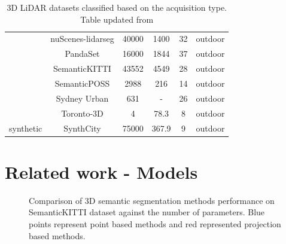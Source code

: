 \begin{table}[h!]
\begin{tabular}{c|c|c|c|c|c}
                                    & nuScenes-lidarseg\cite{caesar2020nuscenes} & 40000 & 1400 & 32& outdoor\\ %
                                    & PandaSet\cite{PandaSet} & 16000 & 1844 & 37 & outdoor \\ %
                                    & SemanticKITTI\cite{Behley_2019_ICCV} & 43552 & 4549 & 28 & outdoor \\ %
                                    & SemanticPOSS\cite{pan2020semanticposs} & 2988 & 216 & 14 & outdoor \\ %
                                    & Sydney Urban\cite{de2013unsupervised} & 631 & - & 26 & outdoor\\ %
                                    & Toronto-3D\cite{tan2020toronto3d} & 4 & 78.3& 8& outdoor\\ %

        \hline
        \multirow{1}{*}{synthetic}  & SynthCity\cite{griffiths2019synthcity} & 75000 & 367.9 & 9 & outdoor \\ %
        \hline
    \end{tabular}
    \caption{3D LiDAR datasets classified based on the acquisition type. Table updated from \cite{survey3d}}
    \label{table:3d_lidar_datasets_table}
\end{table}
\newpage
\section{Related work - Models}
\begin{figure}
    \centering
    
    \caption{Comparison of 3D semantic segmentation methods performance on SemanticKITTI dataset against the number of parameters. 
             Blue points represent point based methods and red represented projection based methods.}
\end{figure}

